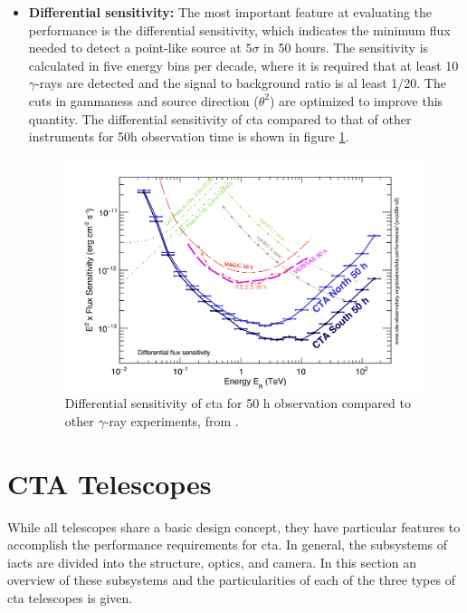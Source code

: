 \documentclass[main.tex]{subfiles}
\begin{document}
\begin{itemize}
\item \textbf{Differential sensitivity:} The most important feature at evaluating the performance is the differential sensitivity, which indicates the minimum flux needed to detect a point-like source at $5\sigma$ in 50 hours. The sensitivity is calculated in five energy bins per decade, where it is required that at least 10 $\gamma$-rays are detected and the signal to background ratio is al least 1/20. The cuts in gammaness and source direction ($\theta^2$) are optimized to improve this quantity. The differential sensitivity of \gls{cta} compared to that of other instruments for 50h observation time is shown in figure \ref{fig:ctaperformance}.\\

  \begin{figure}[h]
    \centering
    \includegraphics[width=1\textwidth]{Pictures/CTA-Performance-prod3b-v2-Comparison-DifferentialSensitivity-OtherInstruments.pdf}
    \caption{Differential sensitivity of \gls{cta} for 50 h observation compared to other $\gamma$-ray experiments, from \cite{CTAPerformance}.}
    \label{fig:ctaperformance}
  \end{figure}

\end{itemize}

\section{CTA Telescopes} \label{sec:ctatelescopes}

While all telescopes share a basic design concept, they have particular features to accomplish the performance requirements for \gls{cta}. In general, the subsystems of \glspl{iact} are divided into the structure, optics, and camera. In this section an overview of these subsystems and the particularities of each of the three types of \gls{cta} telescopes is given.
\end{document}
